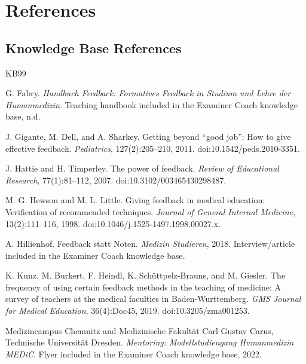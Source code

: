 \section*{References}

\subsection*{Knowledge Base References}
\renewcommand{\refname}{}
\vspace{-1.2\baselineskip}
\begin{thebibliography}{KB99}

G. Fabry.
\newblock \emph{Handbuch Feedback: Formatives Feedback in Studium und Lehre der Humanmedizin}.
\newblock Teaching handbook included in the Examiner Coach knowledge base, n.d.

J. Gigante, M. Dell, and A. Sharkey.
\newblock Getting beyond ``good job'': How to give effective feedback.
\newblock \emph{Pediatrics}, 127(2):205--210, 2011.
\newblock doi:10.1542/peds.2010-3351.

J. Hattie and H. Timperley.
\newblock The power of feedback.
\newblock \emph{Review of Educational Research}, 77(1):81--112, 2007.
\newblock doi:10.3102/003465430298487.

M. G. Hewson and M. L. Little.
\newblock Giving feedback in medical education: Verification of recommended techniques.
\newblock \emph{Journal of General Internal Medicine}, 13(2):111--116, 1998.
\newblock doi:10.1046/j.1525-1497.1998.00027.x.

A. Hillienhof.
\newblock Feedback statt Noten.
\newblock \emph{Medizin Studieren}, 2018.
\newblock Interview/article included in the Examiner Coach knowledge base.

K. Kunz, M. Burkert, F. Heindl, K. Sch{\"u}ttpelz-Brauns, and M. Giesler.
\newblock The frequency of using certain feedback methods in the teaching of medicine: A survey of teachers at the medical faculties in Baden-Wurttemberg.
\newblock \emph{GMS Journal for Medical Education}, 36(4):Doc45, 2019.
\newblock doi:10.3205/zma001253.

Medizincampus Chemnitz and Medizinische Fakult{\"a}t Carl Gustav Carus, Technische Universit{\"a}t Dresden.
\newblock \emph{Mentoring: Modellstudiengang Humanmedizin MEDiC}.
\newblock Flyer included in the Examiner Coach knowledge base, 2022.


\end{thebibliography}
